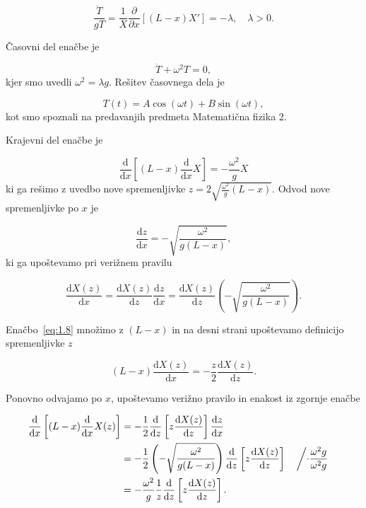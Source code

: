 \[ \frac{\ddot{T}}{gT} = \frac{1}{X} \frac{\partial }{\partial x}  \left[ (L - x) X' \right] = - \lambda, \quad \lambda > 0.
\]

Časovni del enačbe je 

\[ \ddot{T} + \omega ^2 T = 0, 
\]
kjer smo uvedli \( \omega ^2 = \lambda g \). Rešitev časovnega dela je

\begin{equation}
\label{eq:1.6}
T(t) = A \cos \left( \omega t \right) + B \sin \left( \omega t \right),
\end{equation}
kot smo spoznali na predavanjih predmeta Matematična fizika 2.

Krajevni del enačbe je

\begin{equation}
\label{eq:1.7}
 \frac{\mathrm{d}}{\mathrm{d} x} \left[ (L - x) \frac{\mathrm{d} }{\mathrm{d} x} X \right]= - \frac{\omega ^2}{g} X
\end{equation}
ki ga rešimo z uvedbo nove spremenljivke \( z = 2 \sqrt{\frac{\omega ^2}{g} (L - x)} \). Odvod nove spremenljivke po \( x \) je

\[ \frac{\mathrm{d} z}{\mathrm{d} x} = - \sqrt{\frac{\omega ^2}{g(L - x)}},
\]
ki ga upoštevamo pri verižnem pravilu

\begin{equation}
\label{eq:1.8}
 \frac{\mathrm{d} X(z)}{\mathrm{d} x} = \frac{\mathrm{d} X(z)}{\mathrm{d} z} \frac{\mathrm{d} z}{\mathrm{d} x} = \frac{\mathrm{d} X(z)}{\mathrm{d} z} \left( - \sqrt{\frac{\omega ^2}{g(L - x)}} \right).
\end{equation}

Enačbo~\eqref{eq:1.8} množimo z \( (L -x) \) in na desni strani upoštevamo definicijo spremenljivke \( z \)

\[ (L - x) \frac{\mathrm{d} X(z) }{\mathrm{d} x} = - \frac{z}{2} \frac{\mathrm{d} X(z) }{\mathrm{d} z}.
\]

Ponovno odvajamo po \( x \), upoštevamo verižno pravilo in enakost iz zgornje enačbe

\begin{equation}
\label{eq:1.9}
\begin{aligned}
  \frac{\mathrm{d} }{\mathrm{d} x} \left[ (L - x) \frac{\mathrm{d} }{\mathrm{d} x} X(z) \right] &= - \frac{1}{2} \frac{\mathrm{d} }{\mathrm{d} z} \left[ z \frac{\mathrm{d} X(z)}{\mathrm{d} z} \right] \frac{\mathrm{d} z}{\mathrm{d} x} \\
                                                                                                &= - \frac{1}{2} \left( - \sqrt{\frac{\omega ^2}{g(L - x)}} \right) \frac{\mathrm{d} }{\mathrm{d} z} \left[ z \frac{\mathrm{d} X(z)}{\mathrm{d} z} \right] && \left/ \cdot \frac{\omega ^2 g}{\omega ^2 g} \right. \\
  &= - \frac{\omega ^2}{g} \frac{1}{z} \frac{\mathrm{d} }{\mathrm{d} z}\left[ z \frac{\mathrm{d} X(z)}{\mathrm{d} z} \right].
\end{aligned}
\end{equation}

